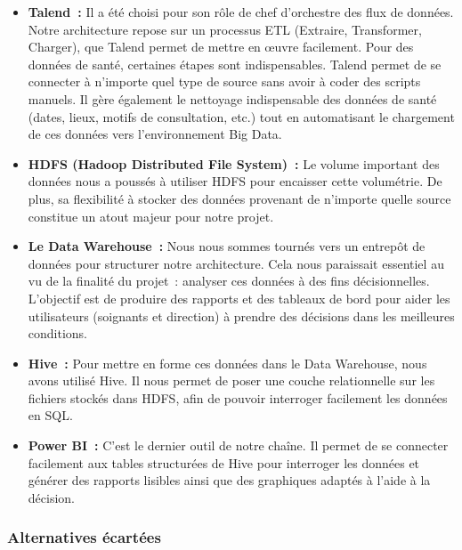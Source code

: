 \begin{itemize}
	\item \textbf{Talend~:} Il a été choisi pour son rôle de chef d'orchestre des flux de données. Notre architecture repose sur un processus ETL (Extraire, Transformer, Charger), que Talend permet de mettre en œuvre facilement. Pour des données de santé, certaines étapes sont indispensables. Talend permet de se connecter à n'importe quel type de source sans avoir à coder des scripts manuels. Il gère également le nettoyage indispensable des données de santé (dates, lieux, motifs de consultation, etc.) tout en automatisant le chargement de ces données vers l'environnement Big Data.
	\item \textbf{HDFS (Hadoop Distributed File System)~:} Le volume important des données nous a poussés à utiliser HDFS pour encaisser cette volumétrie. De plus, sa flexibilité à stocker des données provenant de n'importe quelle source constitue un atout majeur pour notre projet.
	\item \textbf{Le Data Warehouse~:} Nous nous sommes tournés vers un entrepôt de données pour structurer notre architecture. Cela nous paraissait essentiel au vu de la finalité du projet~: analyser ces données à des fins décisionnelles. L'objectif est de produire des rapports et des tableaux de bord pour aider les utilisateurs (soignants et direction) à prendre des décisions dans les meilleures conditions.
	\item \textbf{Hive~:} Pour mettre en forme ces données dans le Data Warehouse, nous avons utilisé Hive. Il nous permet de poser une couche relationnelle sur les fichiers stockés dans HDFS, afin de pouvoir interroger facilement les données en SQL.
	\item \textbf{Power BI~:} C'est le dernier outil de notre chaîne. Il permet de se connecter facilement aux tables structurées de Hive pour interroger les données et générer des rapports lisibles ainsi que des graphiques adaptés à l'aide à la décision.
\end{itemize}

\subsubsection*{Alternatives écartées}

